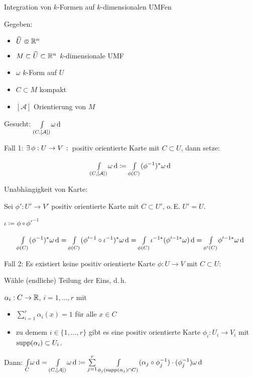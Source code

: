 \documentclass{cheat-sheet}
\newcommand{\Atlas}{\mathcal{A}} %
\begin{document}
Integration von $k$-Formen auf $k$-dimensionalen UMFen

Gegeben:
\begin{itemize}
  \item $\widehat{U} \opn \R^n$
  \item $M \subset \widehat{U} \subset \mathbb{R}^n$ $k$-dimensionale UMF
  \item $\omega$ $k$-Form auf $U$
  \item $C \subset M$ kompakt
  \item $[\Atlas]$ Orientierung von $M$
\end{itemize}

Gesucht: $\Int{(C, [\Atlas])}{}{\omega}{}$

Fall 1: $\exists \, {\phi : U \to V} \,:\,$ positiv orientierte Karte mit $C \subset U$, dann setze:


\[ \Int{(C, [\Atlas])}{}{\omega}{} \coloneqq \Int{\phi(C)}{}{(\phi^{-1})^* \omega} \]

Unabhängigkeit von Karte:

Sei $\phi' : U' \to V'$ positiv orientierte Karte mit $C \subset U'$, o.\,E. $U' = U$.

$\iota \coloneqq \phi \circ \phi'^{-1}$

\[ {\textstyle \int\limits_{\phi(C)}^{}} (\phi^{-1})^* \omega \,\mathrm{d} = {\textstyle \int\limits_{\phi(C)}^{}} (\phi'^{-1} \circ \iota^{-1})^* \omega \,\mathrm{d} = {\textstyle \int\limits_{\phi(C)}^{}} \iota^{-1*} (\phi'^{-1*} \omega) \,\mathrm{d} = {\textstyle \int\limits_{\phi'(C)}^{}} \phi'^{-1*} \omega \,\mathrm{d} \]


Fall 2: Es existiert keine positiv orientierte Karte $\phi : U \to V$ mit $C \subset U$:

Wähle (endliche) Teilung der Eins, d.\,h.

$\alpha_i : C \to \mathbb{R}$, $i = 1, ..., r$ mit

\begin{itemize}
  \item $\sum_{i=1}^r \alpha_i(x) = 1$ für alle $x \in C$
  \item zu demem $i \in \{ 1, ..., r\}$ gibt es eine positiv orientierte Karte $\phi_i : U_i \to V_i$ mit $\mathop{\mathrm{supp}}(\alpha_i) \subset U_i$.
\end{itemize}

Dann: $\Int{C}{}{\omega}{} = \Int{(C, [\Atlas])}{}{\omega}{} \coloneqq \sum_{j=1}^r \Int{\phi_j(\supp(\alpha_j) \cap C)}{}{(\alpha_j \circ \phi_j^{-1}) \cdot (\phi_j^{-1}) \omega}{}$
\end{document}
